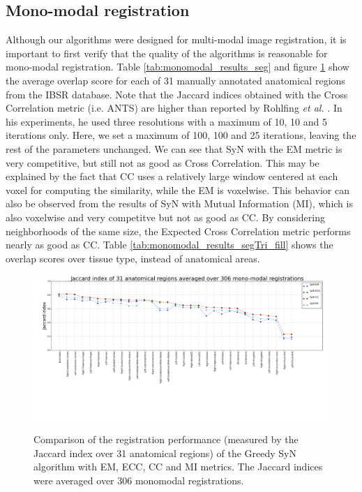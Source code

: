 \subsection{Mono-modal registration}
Although our algorithms were designed for multi-modal image registration, it is important to first verify that the quality of the algorithms is reasonable for mono-modal registration.
Table \ref{tab:monomodal_results_seg} and figure \ref{fig:mono_graph_seg} show the average overlap score for each of 31 manually annotated anatomical regions from the IBSR database.
Note that the Jaccard indices obtained with the Cross Correlation metric (i.e. ANTS) are higher than reported by Rohlfing {\it et al.} \cite{Rohlfing2012}. In his experiments, he used
three resolutions with a maximum of 10, 10 and 5 iterations only. Here, we set a maximum of 100, 100 and 25 iterations, leaving the rest of the parameters
unchanged. We can see that SyN with the EM metric is very competitive, but still not as good as Cross Correlation. This may be explained by the fact that CC uses a relatively large
window centered at each voxel for computing the similarity, while the EM is voxelwise. This behavior can also be observed from the results of SyN with Mutual Information (MI), which is also
voxelwise and very competitve but not as good as CC. By considering neighborhoods of the same size, the Expected Cross Correlation metric performs
nearly as good as CC. Table \ref{tab:monomodal_results_segTri_fill} shows the overlap scores over tissue type, instead of anatomical areas.




\begin{figure}[H]
\centering
\includegraphics[width=1.0\linewidth]{./images/mono_lines_seg.png}\\
\caption{Comparison of the registration performance (measured by the Jaccard index over 31 anatomical regions) of the Greedy SyN algorithm with EM, ECC, CC and MI metrics. The Jaccard
indices were averaged over 306 monomodal registrations.}
\label{fig:mono_graph_seg}
\end{figure}

